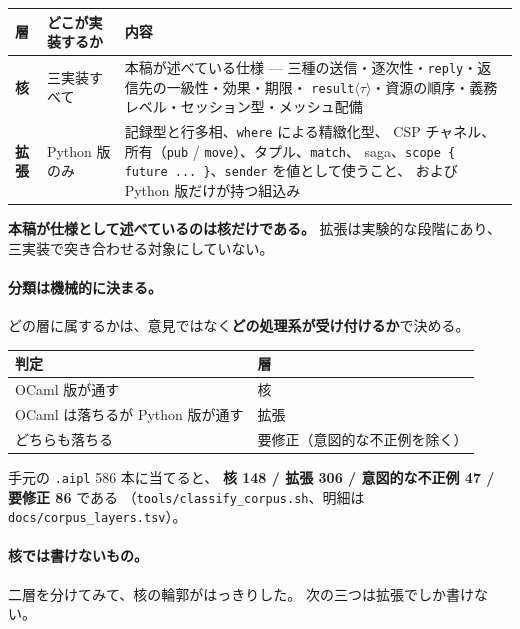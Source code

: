 \documentclass[11pt,a4paper]{ltjsarticle}
\theoremstyle{definition}
\theoremstyle{remark}
\begin{document}
\begin{center}
\small
\begin{tabular}{p{}p{}p{}}
\toprule
層 & どこが実装するか & 内容 \\
\midrule
\textbf{核} & 三実装すべて & 本稿が述べている仕様 ---
  三種の送信・逐次性・\texttt{reply}・返信先の一級性・効果・期限・
  \texttt{result}$\langle\tau\rangle$・資源の順序・義務レベル・セッション型・メッシュ配備 \\
\addlinespace
\textbf{拡張} & Python 版のみ & 記録型と行多相、\texttt{where} による精緻化型、
  CSP チャネル、所有（\texttt{pub} / \texttt{move}）、タプル、\texttt{match}、
  saga、\texttt{scope \{ future ... \}}、\texttt{sender} を値として使うこと、
  および Python 版だけが持つ組込み \\
\bottomrule
\end{tabular}
\end{center}

\textbf{本稿が仕様として述べているのは核だけである。}
拡張は実験的な段階にあり、三実装で突き合わせる対象にしていない。

\paragraph{分類は機械的に決まる。}
どの層に属するかは、意見ではなく\textbf{どの処理系が受け付けるか}で決める。

\begin{center}
\begin{tabular}{ll}
\toprule
判定 & 層 \\
\midrule
OCaml 版が通す & 核 \\
OCaml は落ちるが Python 版が通す & 拡張 \\
どちらも落ちる & 要修正（意図的な不正例を除く） \\
\bottomrule
\end{tabular}
\end{center}

手元の \texttt{.aipl} 586 本に当てると、
\textbf{核 148 / 拡張 306 / 意図的な不正例 47 / 要修正 86} である
（\texttt{tools/classify\_corpus.sh}、明細は \texttt{docs/corpus\_layers.tsv}）。

\paragraph{核では書けないもの。}
二層を分けてみて、核の輪郭がはっきりした。
次の三つは拡張でしか書けない。
\end{document}
